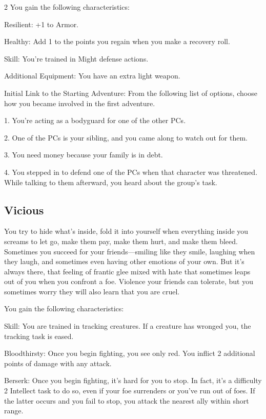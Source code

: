 \begin{multicols}{2}
You gain the following characteristics:

Resilient: +1 to Armor.

Healthy: Add 1 to the points you regain when you make a recovery roll.

Skill: You’re trained in Might defense actions.

Additional Equipment: You have an extra light weapon.

Initial Link to the Starting Adventure: From the following list of options, choose how you became involved in the first adventure.

1. You’re acting as a bodyguard for one of the other PCs.

2. One of the PCs is your sibling, and you came along to watch out for them.

3. You need money because your family is in debt.

4. You stepped in to defend one of the PCs when that character was threatened. While talking to them afterward, you heard about the group’s task.

\subsection{Vicious}

You try to hide what’s inside, fold it into yourself when everything inside you screams to let go, make them pay, make them hurt, and make them bleed. Sometimes you succeed for your friends—smiling like they smile, laughing when they laugh, and sometimes even having other emotions of your own. But it’s always there, that feeling of frantic glee mixed with hate that sometimes leaps out of you when you confront a foe. Violence your friends can tolerate, but you sometimes worry they will also learn that you are cruel.

You gain the following characteristics:

Skill: You are trained in tracking creatures. If a creature has wronged you, the tracking task is eased.

Bloodthirsty: Once you begin fighting, you see only red. You inflict 2 additional points of damage with any attack.

Berserk: Once you begin fighting, it’s hard for you to stop. In fact, it’s a difficulty 2 Intellect task to do so, even if your foe surrenders or you’ve run out of foes. If the latter occurs and you fail to stop, you attack the nearest ally within short range.


\end{multicols}
